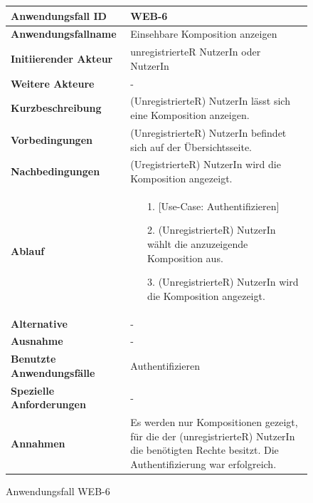\begin{figure}[h]
	\centering
	\begin{tabularx}{\textwidth}{ X | X }
		\textbf{Anwendungsfall ID} & WEB-6 \\ \hline
		\textbf{Anwendungsfallname} & Einsehbare Komposition anzeigen \\ \hline
		\textbf{Initiierender Akteur} & unregistrierteR NutzerIn oder NutzerIn\\ \hline
		\textbf{Weitere Akteure} & - \\ \hline
		\textbf{Kurzbeschreibung} & (UnregistrierteR) NutzerIn  lässt sich eine Komposition anzeigen. \\ \hline
		\textbf{Vorbedingungen} & (UnregistrierteR) NutzerIn befindet sich auf der Übersichtsseite. \\ \hline
		\textbf{Nachbedingungen} & (UregistrierteR) NutzerIn wird die Komposition angezeigt. \\ \hline
		\textbf{Ablauf} &
		\begin{enumerate}
			\item[1.] [Use-Case: Authentifizieren]
			\item[2.] (UnregistrierteR) NutzerIn wählt die anzuzeigende Komposition aus.
			\item[3.] (UnregistrierteR) NutzerIn wird die Komposition angezeigt.
		\end{enumerate} \\ \hline
		\textbf{Alternative} & - \\ \hline
		\textbf{Ausnahme} & - \\ \hline
		\textbf{Benutzte Anwendungsfälle} & Authentifizieren \\ \hline
		\textbf{Spezielle Anforderungen} & - \\ \hline
		\textbf{Annahmen} & Es werden nur Kompositionen gezeigt, für die der (unregistrierteR) NutzerIn die benötigten Rechte besitzt. Die Authentifizierung war erfolgreich.
	\end{tabularx}
	\caption{Anwendungsfall WEB-6}
	\label{fig:anwendungsfall-server-tabelle-web-6}
\end{figure}